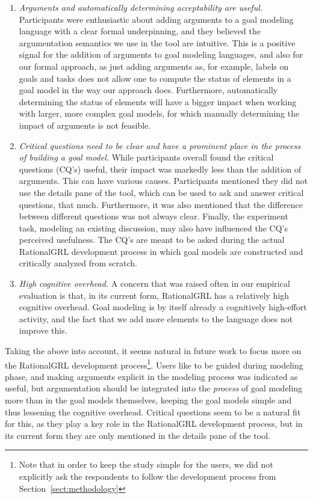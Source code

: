 \begin{enumerate}
\item \emph{Arguments and automatically determining acceptability are useful.} Participants were enthusiastic about adding arguments to a goal modeling language with a clear formal underpinning, and they believed the argumentation semantics we use in the tool are intuitive. This is a positive signal for the addition of arguments to goal modeling languages, and also for our formal approach, as just adding arguments as, for example, labels on goals and tasks does not allow one to compute the status of elements in a goal model in the way our approach does. Furthermore, automatically determining the status of elements will have a bigger impact when working with larger, more complex goal models, for which manually determining the impact of arguments is not feasible.
\item \emph{Critical questions need to be clear and have a prominent place in the process of building a goal model.} While participants overall found the critical questions (CQ's) useful, their impact was markedly less than the addition of arguments. This can have various causes. Participants mentioned they did not use the details pane of the tool, which can be used to ask and answer critical questions, that much. Furthermore, it was also mentioned that the difference between different questions was not always clear. Finally, the experiment task, modeling an existing discussion, may also have influenced the CQ's perceived usefulness. The CQ's are meant to be asked during the actual RationalGRL development process in which goal models are constructed and critically analyzed from scratch. 
\item \emph{High cognitive overhead.} A concern that was raised often in our empirical evaluation is that, in its current form, RationalGRL has a relatively high cognitive overhead. Goal modeling is by itself already a cognitively high-effort activity, and the fact that we add more elements to the language does not improve this. 
\end{enumerate}

Taking the above into account, it seems natural in future work to focus more on the RationalGRL development process\footnote{Note that in order to keep the study simple for the users, we did not explicitly ask the respondents to follow the development process from Section~\ref{sect:methodology}}. Users like to be guided during modeling phase, and making arguments explicit in the modeling process was indicated as useful, but argumentation should be integrated into the \emph{process} of goal modeling more than in the goal models themselves, keeping the goal models simple and thus lessening the cognitive overhead. Critical questions seem to be a natural fit for this, as they play a key role in the RationalGRL development process, but in its current form they are only mentioned in the details pane of the tool.



